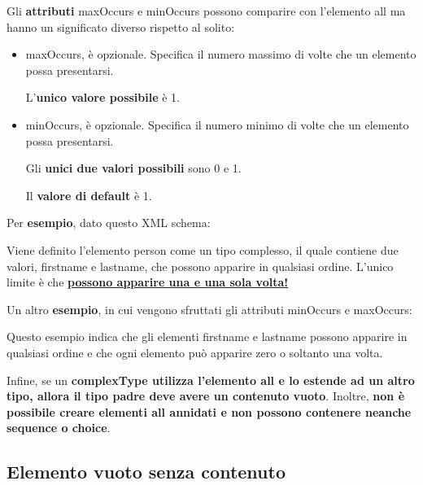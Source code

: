 \documentclass[a4paper]{article}
\begin{document}
	\noindent
	Gli \textbf{attributi} maxOccurs e minOccurs possono comparire con l'elemento \textsf{all} ma hanno un significato diverso rispetto al solito:
	\begin{itemize}
		\item \textcolor{Red3}{\textsf{maxOccurs}}, è opzionale. Specifica il numero massimo di volte che un elemento possa presentarsi.
		
		L'\textbf{unico valore possibile} è 1.
		
		\item \textcolor{Red3}{\textsf{minOccurs}}, è opzionale. Specifica il numero minimo di volte che un elemento possa presentarsi.
		
		Gli \textbf{unici due valori possibili} sono 0 e 1.
		
		Il \textbf{valore di default} è 1.
	\end{itemize}
	Per \textcolor{Green4}{\textbf{esempio}}, dato questo XML schema:
	
	Viene definito l'elemento \textsf{person} come un tipo complesso, il quale contiene due valori, \textsf{firstname} e \textsf{lastname}, che possono apparire in qualsiasi ordine. L'unico limite è che \textbf{\underline{possono apparire una e una sola volta!}}\newline
	
	\noindent
	Un altro \textcolor{Green4}{\textbf{esempio}}, in cui vengono sfruttati gli attributi \textsf{minOccurs} e \textsf{maxOccurs}:
	
	Questo esempio indica che gli elementi \textsf{firstname} e \textsf{lastname} possono apparire in qualsiasi ordine e che ogni elemento può apparire zero o soltanto una volta.\newline
	
	\noindent
	Infine, se un \textbf{\textsf{complexType} utilizza l'elemento \textsf{all} e lo estende ad un altro tipo, allora il tipo padre deve avere un contenuto vuoto}. Inoltre, \textbf{non è possibile creare elementi \textsf{all} annidati e non possono contenere neanche \textsf{sequence} o \textsf{choice}}.\newpage
	
	\subsection{Elemento vuoto senza contenuto}
	
\end{document}
